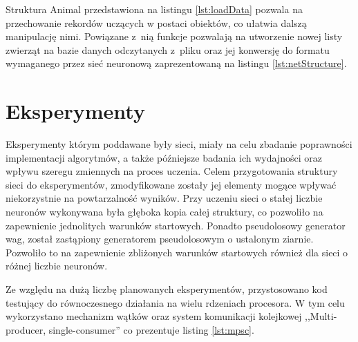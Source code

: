 \documentclass[12pt,twoside]{article}
\begin{document}
\begin{lstlisting}[language=Rust,caption=Moduł odpowiedzialny za załadowanie oraz przygotowanie danych,label={lst:loadData}]
\end{lstlisting}

Struktura Animal przedstawiona na listingu \ref{lst:loadData} pozwala na przechowanie rekordów uczących w postaci obiektów, co ułatwia dalszą manipulację nimi.
Powiązane z~nią funkcje pozwalają na utworzenie nowej listy zwierząt na bazie danych odczytanych z~pliku oraz jej konwersję do formatu wymaganego przez sieć neuronową zaprezentowaną na listingu \ref{lst:netStructure}.

\clearpage
\section{Eksperymenty}
Eksperymenty którym poddawane były sieci, miały na celu zbadanie poprawności implementacji algorytmów, a także późniejsze badania ich wydajności oraz wpływu szeregu zmiennych na proces uczenia.
Celem przygotowania struktury sieci do eksperymentów, zmodyfikowane zostały jej elementy mogące wpływać niekorzystnie na powtarzalność wyników.
Przy uczeniu sieci o stałej liczbie neuronów wykonywana była głęboka kopia całej struktury, co pozwoliło na zapewnienie jednolitych warunków startowych.
Ponadto pseudolosowy generator wag, został zastąpiony generatorem pseudolosowym o ustalonym ziarnie.
Pozwoliło to na zapewnienie zbliżonych warunków startowych również dla sieci o różnej liczbie neuronów.

Ze względu na dużą liczbę planowanych eksperymentów, przystosowano kod testujący do równoczesnego działania na wielu rdzeniach procesora.
W tym celu wykorzystano mechanizm wątków oraz system komunikacji kolejkowej ,,Multi-producer, single-consumer'' co prezentuje listing \ref{lst:mpsc}.
\end{document}
